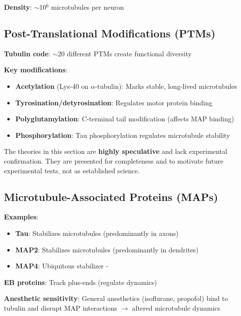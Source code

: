 \textbf{Density}: $\sim$10$^6$ microtubules per neuron

\subsection{Post-Translational Modifications
(PTMs)}\label{post-translational-modifications-ptms}

\textbf{Tubulin code}: $\sim$20 different PTMs create
functional diversity

\textbf{Key modifications}:
\begin{itemize}
\item \textbf{Acetylation} (Lys-40 on $\alpha$-tubulin): Marks stable, long-lived microtubules
\item \textbf{Tyrosination/detyrosination}: Regulates motor protein binding
\item \textbf{Polyglutamylation}: C-terminal tail modification (affects MAP binding)
\item \textbf{Phosphorylation}: Tau phosphorylation regulates
microtubule stability
\end{itemize}


\begin{warningbox}
The theories in this section are \textbf{highly speculative} and lack experimental confirmation. They are presented for completeness and to motivate future experimental tests, not as established science.
\end{warningbox}

\subsection{Microtubule-Associated Proteins
(MAPs)}\label{microtubule-associated-proteins-maps}

\textbf{Examples}:
\begin{itemize}
\item \textbf{Tau}: Stabilizes microtubules
(predominantly in axons)
\item \textbf{MAP2}: Stabilizes microtubules
(predominantly in dendrites)
\item \textbf{MAP4}: Ubiquitous stabilizer -
\end{itemize}

\textbf{EB proteins}: Track plus-ends (regulate dynamics)

\textbf{Anesthetic sensitivity}: General anesthetics (isoflurane,
propofol) bind to tubulin and disrupt MAP interactions
$\rightarrow$ altered microtubule dynamics

